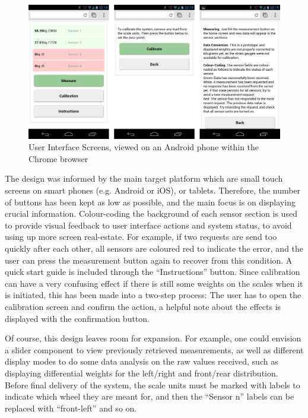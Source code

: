 \begin{figure}
\includegraphics[width=\textwidth]{images/screenshots/ui-screenshot.png}
\caption{User Interface Screens, viewed on an Android phone within the Chrome browser}
\label{ui-screenshot}
\end{figure}

The design was informed by the main target platform which are small touch screens on smart phones (e.g. Android or iOS), or tablets. Therefore, the number of buttons has been kept as low as possible, and the main focus is on displaying crucial information. Colour-coding the background of each sensor section is used to provide visual feedback to user interface actions and system status, to avoid using up more screen real-estate. For example, if two requests are send too quickly after each other, all sensors are coloured red to indicate the error, and the user can press the measurement button again to recover from this condition. A quick start guide is included through the ``Instructions'' button. Since calibration can have a very confusing effect if there is still some weights on the scales when it is initiated, this has been made into a two-step process: The user has to open the calibration screen and confirm the action, a helpful note about the effects is displayed with the confirmation button.

Of course, this design leaves room for expansion. For example, one could envision a slider component to view previously retrieved measurements, as well as different display modes to do some data analysis on the raw values received, such as displaying differential weights for the left/right and front/rear distribution. Before final delivery of the system, the scale units must be marked with labels to indicate which wheel they are meant for, and then the ``Sensor n'' labels can be replaced with ``front-left'' and so on.
